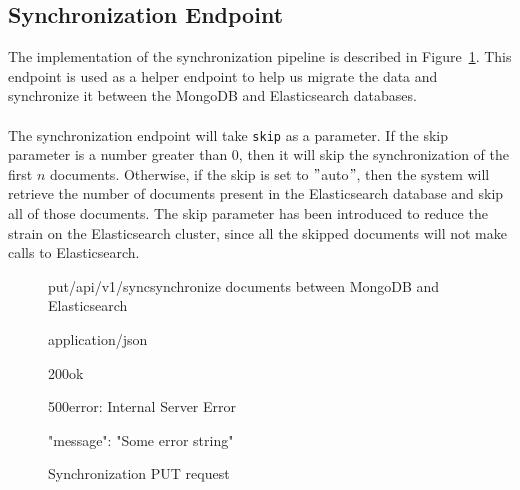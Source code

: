 \subsection{Synchronization Endpoint}\label{subsec:synchronization-endpoint}
The implementation of the synchronization pipeline is described in Figure~\ref{fig:sync-request}.
This endpoint is used as a helper endpoint to help us migrate the data and synchronize it between the MongoDB and Elasticsearch databases. \\ \\
The synchronization endpoint will take \verb|skip| as a parameter.
If the skip parameter is a number greater than 0, then it will skip the synchronization of the first $n$ documents.
Otherwise, if the skip is set to \("\)auto\("\), then the system will retrieve the number of documents present in the Elasticsearch database and skip all of those documents.
The skip parameter has been introduced to reduce the strain on the Elasticsearch cluster, since all the skipped documents will not make calls to Elasticsearch.

\begin{figure}[!h]
    \begin{apiRoute}{put}{/api/v1/sync}{synchronize documents between MongoDB and Elasticsearch}
        \begin{routeParameter}
        \end{routeParameter}

        \begin{routeResponse}{application/json}
            \begin{routeResponseItem}{200}{ok}
            \end{routeResponseItem}

            \begin{routeResponseItem}{500}{error: Internal Server Error}
                \begin{routeResponseItemBody}
{
    "message": "Some error string"
}
                \end{routeResponseItemBody}
            \end{routeResponseItem}
        \end{routeResponse}
    \end{apiRoute}

    \caption{Synchronization PUT request}
    \label{fig:sync-request}
\end{figure}

